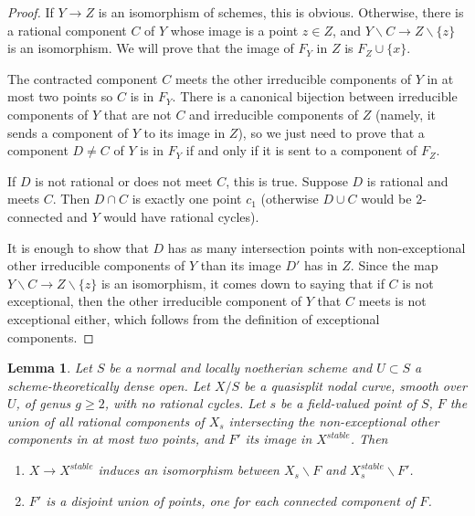 \documentclass[a4paper,10pt,twoside]{article}
\newcommand{\ra}{\rightarrow}
\newtheorem{lem}[thm]{Lemma}
\theoremstyle{definition}
\theoremstyle{remark}
\begin{document}
\begin{proof}
If $Y\ra Z$ is an isomorphism of schemes, this is obvious. Otherwise, there is a rational component $C$ of $Y$ whose image is a point $z\in Z$, and $Y\backslash C\ra Z\backslash \{z\}$ is an isomorphism. We will prove that the image of $F_Y$ in $Z$ is $F_Z\cup\{x\}$.

The contracted component $C$ meets the other irreducible components of $Y$ in at most two points so $C$ is in $F_Y$. There is a canonical bijection between irreducible components of $Y$ that are not $C$ and irreducible components of $Z$ (namely, it sends a component of $Y$ to its image in $Z$), so we just need to prove that a component $D\neq C$ of $Y$ is in $F_Y$ if and only if it is sent to a component of $F_Z$.

If $D$ is not rational or does not meet $C$, this is true. Suppose $D$ is rational and meets $C$. Then $D\cap C$ is exactly one point $c_1$ (otherwise $D\cup C$ would be $2$-connected and $Y$ would have rational cycles).

It is enough to show that $D$ has as many intersection points with non-exceptional other irreducible components of $Y$ than its image $D'$ has in $Z$. Since the map $Y\backslash C\ra Z\backslash \{z\}$ is an isomorphism, it comes down to saying that if $C$ is not exceptional, then the other irreducible component of $Y$ that $C$ meets is not exceptional either, which follows from the definition of exceptional components.
\end{proof}

\begin{lem}\label{lemme les composantes avec <3 points sont contractees dans X^stable}
Let $S$ be a normal and locally noetherian scheme and $U\subset S$ a scheme-theoretically dense open. Let $X/S$ be a quasisplit nodal curve, smooth over $U$, of genus $g\geq 2$, with no rational cycles. Let $s$ be a field-valued point of $S$, $F$ the union of all rational components of $X_s$ intersecting the non-exceptional other components in at most two points, and $F'$ its image in $X^{stable}$. Then
\begin{enumerate}
\item $X\ra X^{stable}$ induces an isomorphism between $X_s\backslash F$ and $X^{stable}_s\backslash F'$.
\item $F'$ is a disjoint union of points, one for each connected component of $F$. 
\end{enumerate}
\end{lem}
\end{document}
